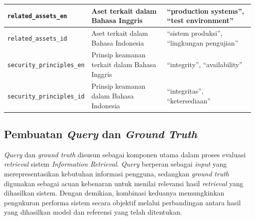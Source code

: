\begin{table}[H]
\begin{tabular}{|>{\raggedright\arraybackslash}p{3.2cm}|>{\raggedright\arraybackslash}p{4.8cm}|>{\raggedright\arraybackslash}p{4.8cm}|}
\hline
\texttt{related}\newline\texttt{\_assets\_en} & Aset terkait dalam Bahasa Inggris & ``production systems'', ``test environment'' \\
\hline
\texttt{related}\newline\texttt{\_assets\_id} & Aset terkait dalam Bahasa Indonesia & ``sistem produksi'', ``lingkungan pengujian'' \\
\hline
\texttt{security}\newline\texttt{\_principles\_en} & Prinsip keamanan terkait dalam Bahasa Inggris & ``integrity'', ``availability'' \\
\hline
\texttt{security}\newline\texttt{\_principles\_id} & Prinsip keamanan dalam Bahasa Indonesia & ``integritas'', ``ketersediaan'' \\
\hline
\end{tabular}
\end{table}

\subsection{Pembuatan \textit{Query} dan \textit{Ground Truth}}

\textit{Query} dan \textit{ground truth} disusun sebagai komponen utama dalam proses evaluasi \textit{retrieval} sistem \textit{Information Retrieval}. \textit{Query} berperan sebagai \textit{input} yang merepresentasikan kebutuhan informasi pengguna, sedangkan \textit{ground truth} digunakan sebagai acuan kebenaran untuk menilai relevansi hasil \textit{retrieval} yang dihasilkan sistem. Dengan demikian, kombinasi keduanya memungkinkan pengukuran performa sistem secara objektif melalui perbandingan antara hasil yang dihasilkan model dan referensi yang telah ditentukan.

